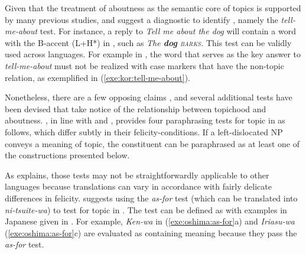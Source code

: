 Given that the treatment of aboutness as the semantic core of topics
is supported by many previous studies, \citet{reinhart:81} and
\citet{choi:99} suggest a diagnostic to identify , namely the
\textit{tell-me-about} test. For
instance, a reply to \textit{Tell me about the dog} will contain a
word with the B-accent (L+H*) in , such as \textit{The
  \textbf{dog} \textsc{barks}.}  This test can be validly used across
languages. For example in , the word that
serves as the key answer to \textit{tell-me-about} must not be
realized with case markers that have the non-topic relation, as
exemplified in (\ref{exe:kor:tell-me-about}).




Nonetheless, there are a few opposing claims \citep{vermeulen:09}, and
several additional tests have been devised that take notice of the
relationship between topichood and aboutness.  \citet{roberts:11}, in
line with \citet{reinhart:81} and \citet{gundel:85}, provides four
paraphrasing tests for topic in  as follows, which differ
subtly in their felicity-conditions. If a
left-dislocated NP conveys a meaning of topic, the constituent can be
paraphrased as at least one of the constructions presented below.




\noindent As \citet{roberts:11} explains, those tests may not be
straightforwardly applicable to other languages because translations
can vary in accordance with fairly delicate differences in felicity.
\citet{oshima:09} suggests using the \textit{as-for} test (which can
be translated into \textit{ni-tsuite-wa}) to test for topic in
. The test can be defined as  with
examples in Japanese given in . For example,
\textit{Ken-wa} in (\ref{exe:oshima:as-for}a) and \textit{Iriasu-wa}
(\ref{exe:oshima:as-for}c) are evaluated as containing  meaning
because they pass the \textit{as-for} test.

